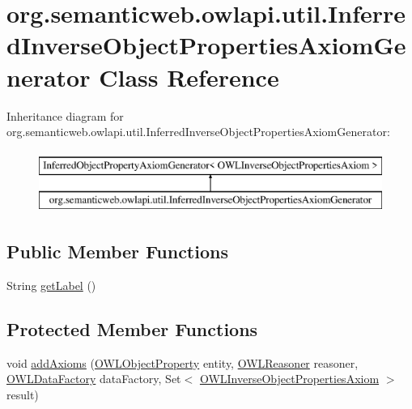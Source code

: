 \hypertarget{classorg_1_1semanticweb_1_1owlapi_1_1util_1_1_inferred_inverse_object_properties_axiom_generator}{\section{org.\-semanticweb.\-owlapi.\-util.\-Inferred\-Inverse\-Object\-Properties\-Axiom\-Generator Class Reference}
\label{classorg_1_1semanticweb_1_1owlapi_1_1util_1_1_inferred_inverse_object_properties_axiom_generator}
}
Inheritance diagram for org.\-semanticweb.\-owlapi.\-util.\-Inferred\-Inverse\-Object\-Properties\-Axiom\-Generator\-:\begin{figure}[H]
\begin{center}
\leavevmode
\includegraphics[height=2.000000cm]{classorg_1_1semanticweb_1_1owlapi_1_1util_1_1_inferred_inverse_object_properties_axiom_generator}
\end{center}
\end{figure}
\subsection*{Public Member Functions}
\begin{DoxyCompactItemize}
\item 
String \hyperlink{classorg_1_1semanticweb_1_1owlapi_1_1util_1_1_inferred_inverse_object_properties_axiom_generator_ac768a5aa2500546405a6571f25a4a2a5}{get\-Label} ()
\end{DoxyCompactItemize}
\subsection*{Protected Member Functions}
\begin{DoxyCompactItemize}
\item 
void \hyperlink{classorg_1_1semanticweb_1_1owlapi_1_1util_1_1_inferred_inverse_object_properties_axiom_generator_a2b89c570b81336e85369ee08c975ea26}{add\-Axioms} (\hyperlink{interfaceorg_1_1semanticweb_1_1owlapi_1_1model_1_1_o_w_l_object_property}{O\-W\-L\-Object\-Property} entity, \hyperlink{interfaceorg_1_1semanticweb_1_1owlapi_1_1reasoner_1_1_o_w_l_reasoner}{O\-W\-L\-Reasoner} reasoner, \hyperlink{interfaceorg_1_1semanticweb_1_1owlapi_1_1model_1_1_o_w_l_data_factory}{O\-W\-L\-Data\-Factory} data\-Factory, Set$<$ \hyperlink{interfaceorg_1_1semanticweb_1_1owlapi_1_1model_1_1_o_w_l_inverse_object_properties_axiom}{O\-W\-L\-Inverse\-Object\-Properties\-Axiom} $>$ result)
\end{DoxyCompactItemize}


